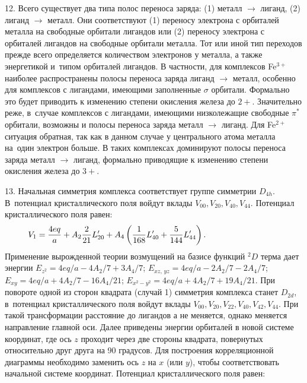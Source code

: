 12. Всего существует два типа полос переноса заряда: (1) металл $\rightarrow$ лиганд, (2) лиганд $\rightarrow$ металл. Они соответствуют (1) переносу электрона с орбиталей металла на свободные орбитали лигандов или (2) переносу электрона с орбиталей лигандов на свободные орбитали металла. Тот или иной тип переходов прежде всего определяется количеством электронов у металла, а также энергетикой и~типом орбиталей лигандов. В частности, для комплексов Fe$^{3+}$ наиболее распространены полосы переноса заряда лиганд $\rightarrow$ металл, особенно для комплексов с лигандами, имеющими заполненные $\sigma$ орбитали. Формально это будет приводить к изменению степени окисления железа до $2+$. Значительно реже, в~случае комплексов с лигандами, имеющими низколежащие свободные $\pi^*$ орбитали, возможны и полосы переноса заряда металл $\rightarrow$ лиганд. Для Fe$^{2+}$ ситуация обратная, так как в данном случае у центрального атома металла на~один электрон больше. В таких комплексах доминируют полосы переноса заряда металл $\rightarrow$ лиганд, формально приводящие к изменению степени окисления железа до $3+$.\par
13. Начальная симметрия комплекса соответствует группе симметрии $D_{4h}$. В~потенциал кристаллического поля войдут вклады $V_{00}, V_{20}, V_{40}, V_{44}$. Потенциал кристаллического поля равен:
\begin{equation*}
\begin{aligned}
& V_{1}= \dfrac{4eq}{a} + A_2 \dfrac{2}{21}L_{20}' + A_4 \left( \dfrac{1}{168}L_{40}'  + \dfrac{5}{144}L_{44}' \right). \hspace{28mm}
\end{aligned}
\end{equation*}
Применение вырожденной теории возмущений на базисе функций $^2D$ терма дает энергии $E_{z^2} = 4eq/a - 4A_2/7 + {3A_4}/{7}$; $E_{xz,\, yz} = 4eq/a -{2A_2}/{7} - {2A_4}/{7}$; $E_{xy} = 4eq/a + {4A_2}/{7} - {16A_4}/{21}$; $E_{x^2-y^2} = 4eq/a + {4A_2}/{7} + {19A_4}/{21}$. При повороте одной из сторон квадрата (случай 1) симметрия комплекса станет $D_{2d}$, в~потенциал кристаллического поля  войдут вклады $V_{00}, V_{20}, V_{22}, V_{40}, V_{42}, V_{44}$. При такой трансформации расстояние до лигандов $а$ не меняется, однако меняется направление главной оси. Далее приведены энергии орбиталей в новой системе координат, где ось $z$ проходит через две стороны квадрата, повернутых относительно друг друга на 90 градусов. Для построения корреляционной диаграммы необходимо заменить ось $z$ на $x$ (или $y$), чтобы соответствовать начальной системе координат. Потенциал кристаллического поля равен:
